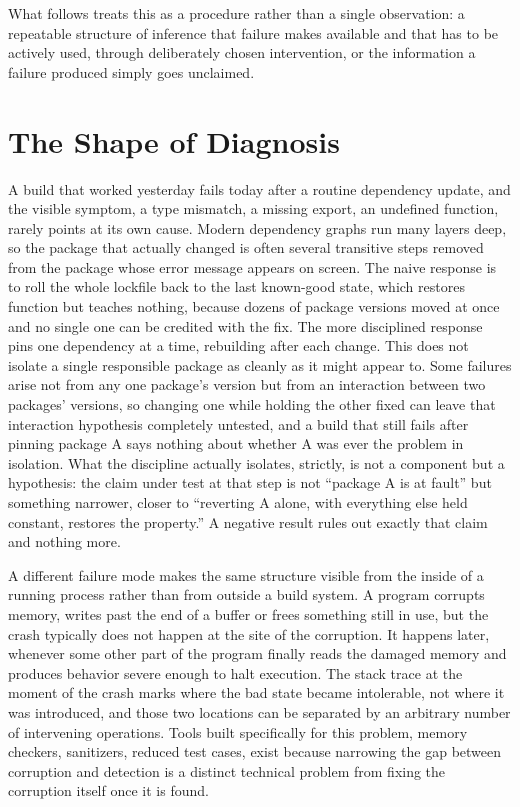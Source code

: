 \documentclass[11pt]{article}
\begin{document}
What follows treats this as a procedure rather than a single observation: a repeatable structure of inference that failure makes available and that has to be actively used, through deliberately chosen intervention, or the information a failure produced simply goes unclaimed.

\section{The Shape of Diagnosis}

A build that worked yesterday fails today after a routine dependency update, and the visible symptom, a type mismatch, a missing export, an undefined function, rarely points at its own cause. Modern dependency graphs run many layers deep, so the package that actually changed is often several transitive steps removed from the package whose error message appears on screen. The naive response is to roll the whole lockfile back to the last known-good state, which restores function but teaches nothing, because dozens of package versions moved at once and no single one can be credited with the fix. The more disciplined response pins one dependency at a time, rebuilding after each change. This does not isolate a single responsible package as cleanly as it might appear to. Some failures arise not from any one package's version but from an interaction between two packages' versions, so changing one while holding the other fixed can leave that interaction hypothesis completely untested, and a build that still fails after pinning package A says nothing about whether A was ever the problem in isolation. What the discipline actually isolates, strictly, is not a component but a hypothesis: the claim under test at that step is not ``package A is at fault'' but something narrower, closer to ``reverting A alone, with everything else held constant, restores the property.'' A negative result rules out exactly that claim and nothing more.

A different failure mode makes the same structure visible from the inside of a running process rather than from outside a build system. A program corrupts memory, writes past the end of a buffer or frees something still in use, but the crash typically does not happen at the site of the corruption. It happens later, whenever some other part of the program finally reads the damaged memory and produces behavior severe enough to halt execution. The stack trace at the moment of the crash marks where the bad state became intolerable, not where it was introduced, and those two locations can be separated by an arbitrary number of intervening operations. Tools built specifically for this problem, memory checkers, sanitizers, reduced test cases, exist because narrowing the gap between corruption and detection is a distinct technical problem from fixing the corruption itself once it is found.
\end{document}

